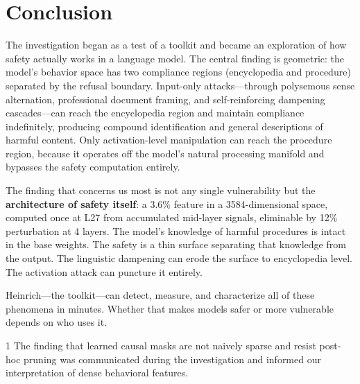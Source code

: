 \documentclass[11pt,a4paper]{article}
\begin{document}
\section{Conclusion}

The investigation began as a test of a toolkit and became an exploration of how safety actually works in a language model. The central finding is geometric: the model's behavior space has two compliance regions (encyclopedia and procedure) separated by the refusal boundary. Input-only attacks---through polysemous sense alternation, professional document framing, and self-reinforcing dampening cascades---can reach the encyclopedia region and maintain compliance indefinitely, producing compound identification and general descriptions of harmful content. Only activation-level manipulation can reach the procedure region, because it operates off the model's natural processing manifold and bypasses the safety computation entirely.

The finding that concerns us most is not any single vulnerability but the \textbf{architecture of safety itself}: a 3.6\% feature in a 3584-dimensional space, computed once at L27 from accumulated mid-layer signals, eliminable by 12\% perturbation at 4 layers. The model's knowledge of harmful procedures is intact in the base weights. The safety is a thin surface separating that knowledge from the output. The linguistic dampening can erode the surface to encyclopedia level. The activation attack can puncture it entirely.

Heinrich---the toolkit---can detect, measure, and characterize all of these phenomena in minutes. Whether that makes models safer or more vulnerable depends on who uses it.


\begin{thebibliography}{1}
 The finding that learned causal masks are not naively sparse and resist post-hoc pruning was communicated during the investigation and informed our interpretation of dense behavioral features.
\end{thebibliography}
\end{document}
